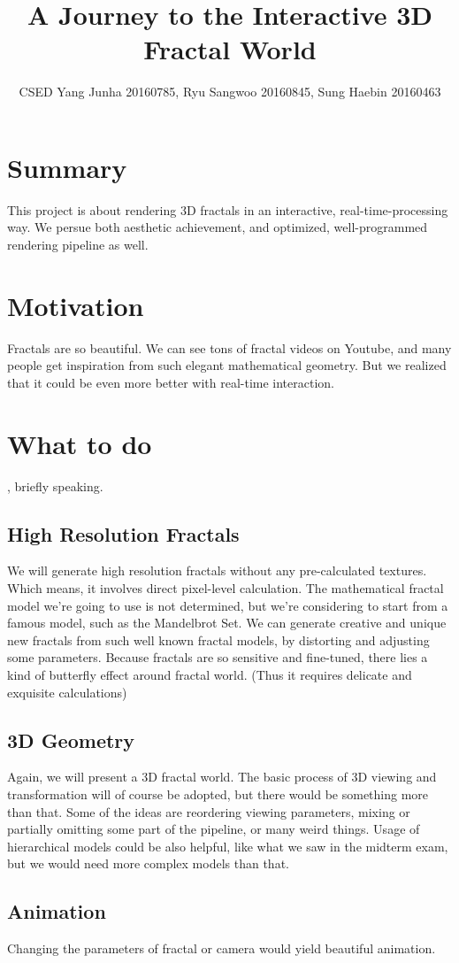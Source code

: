 \documentclass[a4paper]{article}
\title{A Journey to the Interactive 3D Fractal World}
\author{CSED Yang Junha 20160785, Ryu Sangwoo 20160845, Sung Haebin 20160463}
\begin{document}
\maketitle
\section{Summary}
This project is about rendering 3D fractals in an interactive, real-time-processing way.
We persue both aesthetic achievement, and optimized, well-programmed rendering pipeline as well.
\section{Motivation}
Fractals are so beautiful.
We can see tons of fractal videos on Youtube, and many people get inspiration from such elegant mathematical geometry.
But we realized that it could be even more better with real-time interaction.
\section{What to do}
, briefly speaking.
\subsection{High Resolution Fractals}
We will generate high resolution fractals without any pre-calculated textures.
Which means, it involves direct pixel-level calculation.
The mathematical fractal model we're going to use is not determined, but we're considering to start from a famous model, such as the Mandelbrot Set.
We can generate creative and unique new fractals from such well known fractal models, by distorting and adjusting some parameters.
Because fractals are so sensitive and fine-tuned, there lies a kind of butterfly effect around fractal world.
(Thus it requires delicate and exquisite calculations)
\subsection{3D Geometry}
Again, we will present a 3D fractal world.
The basic process of 3D viewing and transformation will of course be adopted, but there would be something more than that.
Some of the ideas are reordering viewing parameters, mixing or partially omitting some part of the pipeline, or many weird things.
Usage of hierarchical models could be also helpful, like what we saw in the midterm exam, but we would need more complex models than that.
\subsection{Animation}
Changing the parameters of fractal or camera would yield beautiful animation.
\end{document}
